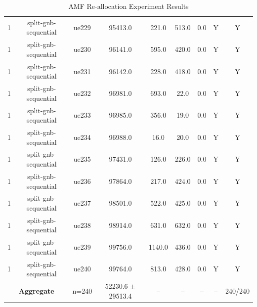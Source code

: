 \begin{table}[ht]
\begin{tabular}{|c|c|c|c|c|c|c|c|c|}
1 & split-gnb-sequential & ue229 & 95413.0 & 221.0 & 513.0 & 0.0 & Y & Y \\
1 & split-gnb-sequential & ue230 & 96141.0 & 595.0 & 420.0 & 0.0 & Y & Y \\
1 & split-gnb-sequential & ue231 & 96142.0 & 228.0 & 418.0 & 0.0 & Y & Y \\
1 & split-gnb-sequential & ue232 & 96981.0 & 693.0 & 22.0 & 0.0 & Y & Y \\
1 & split-gnb-sequential & ue233 & 96985.0 & 356.0 & 19.0 & 0.0 & Y & Y \\
1 & split-gnb-sequential & ue234 & 96988.0 & 16.0 & 20.0 & 0.0 & Y & Y \\
1 & split-gnb-sequential & ue235 & 97431.0 & 126.0 & 226.0 & 0.0 & Y & Y \\
1 & split-gnb-sequential & ue236 & 97864.0 & 217.0 & 424.0 & 0.0 & Y & Y \\
1 & split-gnb-sequential & ue237 & 98501.0 & 522.0 & 425.0 & 0.0 & Y & Y \\
1 & split-gnb-sequential & ue238 & 98914.0 & 631.0 & 632.0 & 0.0 & Y & Y \\
1 & split-gnb-sequential & ue239 & 99756.0 & 1140.0 & 436.0 & 0.0 & Y & Y \\
1 & split-gnb-sequential & ue240 & 99764.0 & 813.0 & 428.0 & 0.0 & Y & Y \\
\multicolumn{2}{|c|}{\textbf{Aggregate}} & n=240 & 52230.6 $\pm$ 29513.4 & -- & -- & -- & -- & 240/240 \\
\hline
\end{tabular}
\caption{AMF Re-allocation Experiment Results}
\label{tab:amf_realloc}
\end{table}

